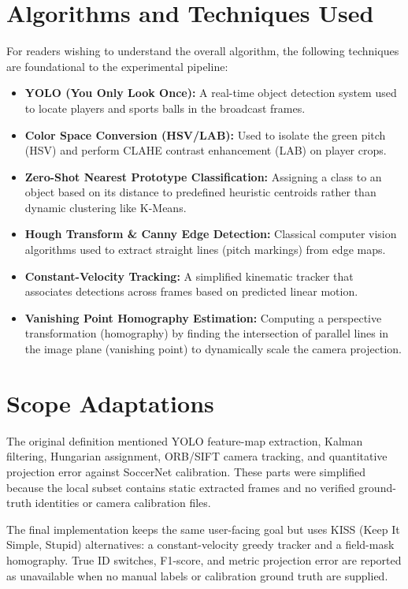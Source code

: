 \documentclass[11pt]{article}
\begin{document}
\section{Algorithms and Techniques Used}
For readers wishing to understand the overall algorithm, the following techniques are foundational to the experimental pipeline:
\begin{itemize}[leftmargin=*]
    \item \textbf{YOLO (You Only Look Once):} A real-time object detection system used to locate players and sports balls in the broadcast frames.
    \item \textbf{Color Space Conversion (HSV/LAB):} Used to isolate the green pitch (HSV) and perform CLAHE contrast enhancement (LAB) on player crops.
    \item \textbf{Zero-Shot Nearest Prototype Classification:} Assigning a class to an object based on its distance to predefined heuristic centroids rather than dynamic clustering like K-Means.
    \item \textbf{Hough Transform \& Canny Edge Detection:} Classical computer vision algorithms used to extract straight lines (pitch markings) from edge maps.
    \item \textbf{Constant-Velocity Tracking:} A simplified kinematic tracker that associates detections across frames based on predicted linear motion.
    \item \textbf{Vanishing Point Homography Estimation:} Computing a perspective transformation (homography) by finding the intersection of parallel lines in the image plane (vanishing point) to dynamically scale the camera projection.
\end{itemize}

\section{Scope Adaptations}
The original definition mentioned YOLO feature-map extraction, Kalman filtering, Hungarian assignment, ORB/SIFT camera tracking, and quantitative projection error against SoccerNet calibration. These parts were simplified because the local subset contains static extracted frames and no verified ground-truth identities or camera calibration files.

The final implementation keeps the same user-facing goal but uses KISS (Keep It Simple, Stupid) alternatives: a constant-velocity greedy tracker and a field-mask homography. True ID switches, F1-score, and metric projection error are reported as unavailable when no manual labels or calibration ground truth are supplied.
\end{document}
